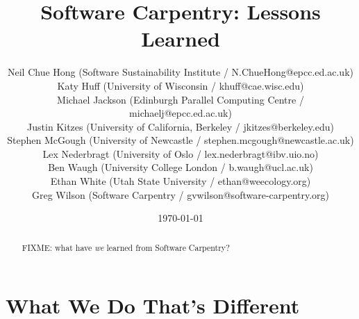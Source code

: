 \documentclass{article}
\begin{document}
\title{Software Carpentry: Lessons Learned}
\date{\today}

\author{
  Neil Chue Hong (Software Sustainability Institute / N.ChueHong@epcc.ed.ac.uk)\\
  Katy Huff (University of  Wisconsin / khuff@cae.wisc.edu)\\
  Michael Jackson (Edinburgh Parallel Computing Centre / michaelj@epcc.ed.ac.uk)\\
  Justin Kitzes (University of California, Berkeley / jkitzes@berkeley.edu)\\
  Stephen McGough (University of Newcastle / stephen.mcgough@newcastle.ac.uk) \\
  Lex Nederbragt (University of Oslo / lex.nederbragt@ibv.uio.no)\\
  Ben Waugh (University College London / b.waugh@ucl.ac.uk)\\
  Ethan White (Utah State University / ethan@weecology.org)\\
  Greg Wilson (Software Carpentry / gvwilson@software-carpentry.org)
}

\maketitle

\begin{abstract}
FIXME: what have \emph{we} learned from Software Carpentry?
\end{abstract}

\section{What We Do That's Different}
\end{document}
